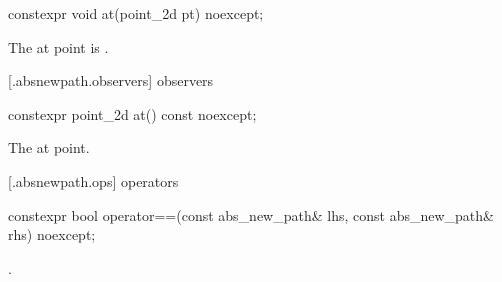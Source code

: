 %
\begin{itemdecl}
constexpr void at(point_2d pt) noexcept;
\end{itemdecl}
\begin{itemdescr}
\pnum
\effects
The at point is .
\end{itemdescr}

 [\iotwod.absnewpath.observers]{ observers}%

%
\begin{itemdecl}
constexpr point_2d at() const noexcept;
\end{itemdecl}
\begin{itemdescr}
\pnum
\returns
The at point.
\end{itemdescr}

 [\iotwod.absnewpath.ops]{ operators}%

%
\begin{itemdecl}
constexpr bool operator==(const abs_new_path& lhs, const abs_new_path& rhs) 
  noexcept;
\end{itemdecl}
\begin{itemdescr}
\pnum
\returns
{}.
\end{itemdescr}
